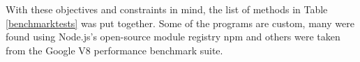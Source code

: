 With these objectives and constraints in mind, the list of methods in Table \ref{benchmarktests} was put together. Some of the programs are custom, many were found using \textsf{Node.js}'s open-source module registry \textsf{npm} and others were taken from the Google V8 performance benchmark suite.

